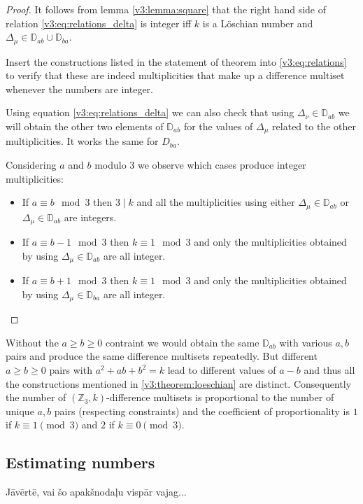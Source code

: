 \begin{proof}
	It follows from lemma \ref{v3:lemma:square} that the right hand side of relation \eqref{v3:eq:relations_delta} is integer iff $k$ is a Löschian number and $\Delta_\mu \in \mathbb D_{ab} \cup \mathbb D_{ba}$.
	
	Insert the constructions listed in the statement of theorem into \eqref{v3:eq:relations} to verify that these are indeed multiplicities that make up a difference multiset whenever the numbers are integer.
	
	Using equation \eqref{v3:eq:relations_delta} we can also check that using $\Delta_\nu \in \mathbb D_{ab}$ we will obtain the other two elements of $\mathbb D_{ab}$ for the values of $\Delta_\mu$ related to the other multiplicities. It works the same for $D_{ba}$.
	
	Considering $a$ and $b$ modulo $3$ we observe which cases produce integer multiplicities:
	\begin{itemize}
		\item If $a \equiv b \mod 3$ then $3 \mid k$ and all the multiplicities using either $\Delta_\mu \in \mathbb D_{ab}$ or $\Delta_\mu \in \mathbb D_{ab}$ are integers.
		\item If $a \equiv b-1 \mod 3$ then $k \equiv 1 \mod 3$ and only the multiplicities obtained by using $\Delta_\mu \in \mathbb D_{ab}$ are all integer.
		\item If $a \equiv b+1 \mod 3$ then $k \equiv 1 \mod 3$ and only the multiplicities obtained by using $\Delta_\mu \in \mathbb D_{ba}$ are all integer.
	\end{itemize}
\end{proof}

\begin{remark}
    Without the $a \geq b \geq 0$ contraint we would obtain the same $\mathbb D_{ab}$ with various $a,b$ pairs and produce the same difference multisets repeatedly.	But different $a \geq b \geq 0$ pairs with $a^2+ab+b^2=k$ lead to different values of $a-b$ and thus all the constructions mentioned in \ref{v3:theorem:loeschian} are distinct. Consequently the number of $(\mathbb Z_3,k)$-difference multisets is proportional to the number of unique $a,b$ pairs (respecting constraints) and the coefficient of proportionality is $1$ if $k\equiv 1\pmod{3}$ and $2$ if $k\equiv 0\pmod{3}$.
\end{remark}

\subsection{Estimating numbers}
    Jāvērtē, vai šo apakšnodaļu vispār vajag...

